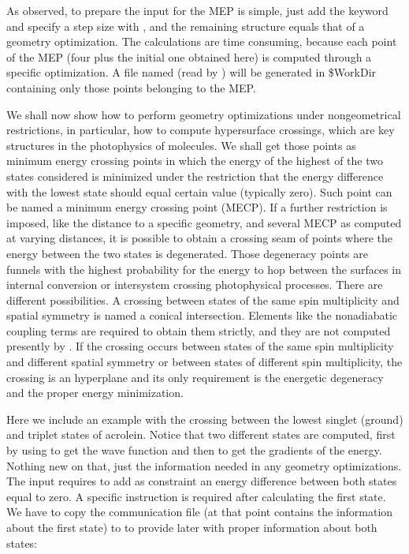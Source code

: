 As observed, to prepare the input for the MEP is simple, just add the keyword 
and specify a step size with , and the remaining structure equals that of a geometry optimization.
The calculations are time consuming, because each point of the
MEP (four plus the initial one obtained here) is computed through a specific optimization.
A file named  (read by  )
will be generated in \$WorkDir containing only those points belonging to the MEP.

We shall now show how to perform geometry optimizations under nongeometrical
restrictions, in particular, how to compute hypersurface crossings, which are key structures
in the photophysics of molecules. We shall get those points as minimum energy crossing points in
which the energy of the highest of the two states considered is minimized under the restriction
that the energy difference with the lowest state should equal certain value (typically zero).
Such point can be named a minimum energy crossing point (MECP). If a further restriction is
imposed, like the distance to a specific geometry, and several MECP as computed at varying distances,
it is possible to obtain a crossing seam of points where the energy between the two states is
degenerated. Those degeneracy points are funnels with the highest probability for the energy
to hop between the surfaces in internal conversion or intersystem crossing photophysical processes.
There are different possibilities. A crossing between states of the same spin
multiplicity and spatial symmetry is named a conical intersection. Elements like the nonadiabatic
coupling terms are required to obtain them strictly, and they are not computed presently
by \molcas. If the crossing occurs between states of the same
spin multiplicity and different spatial symmetry or between states of different spin multiplicity,
the crossing is an hyperplane and its only requirement is the energetic degeneracy and the
proper energy minimization.

Here we include an example with the crossing between the lowest singlet (ground) and triplet 
states of acrolein. Notice that two different states are computed, first by using 
 to get the wave function and then  to get the gradients
of the energy. Nothing new on that, just the information needed in any geometry optimizations.
The  input requires to add as constraint an energy
difference between both states equal to zero. A specific instruction is required after 
calculating the first state. We have to copy the communication file 
(at that point contains the information about the first state) to 
to provide later  with proper information about both states:

